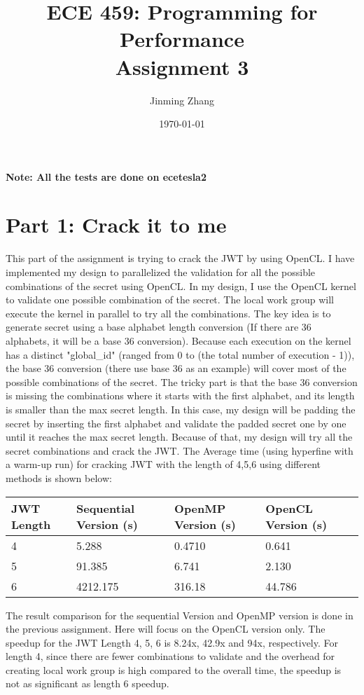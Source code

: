 \documentclass[12pt]{article}
\title{ECE 459: Programming for Performance\\Assignment 3}
\author{Jinming Zhang}
\date{\today}
\begin{document}
\maketitle
\noindent
\textbf{Note: All the tests are done on ecetesla2}
\section{Part 1: Crack it to me}
\noindent
This part of the assignment is trying to crack the JWT by using OpenCL. I have implemented my design to parallelized the validation for all the possible combinations of the secret using OpenCL. In my design, I use the OpenCL kernel to validate one possible combination of the secret. The local work group will execute the kernel in parallel to try all the combinations. The key idea is to generate secret using a base alphabet length conversion (If there are 36 alphabets, it will be a base 36 conversion). Because each execution on the kernel has a distinct "global\_id" (ranged from 0 to (the total number of execution - 1)), the base 36 conversion (there use base 36 as an example) will cover most of the possible combinations of the secret. The tricky part is that the base 36 conversion is missing the combinations where it starts with the first alphabet, and its length is smaller than the max secret length. In this case, my design will be padding the secret by inserting the first alphabet and validate the padded secret one by one until it reaches the max secret length. Because of that, my design will try all the secret combinations and crack the JWT. The Average time (using hyperfine with a warm-up run) for cracking JWT with the length of 4,5,6 using different methods is shown below:
\begin{center}
    \begin{tabular}{ | l | l | l | l | l |}
    \hline
    JWT Length & Sequential Version (s) & OpenMP Version (s) & OpenCL Version (s) \\ 
    \hline
    4 & 5.288 & 0.4710 & 0.641 \\ 
    \hline
    5 & 91.385 & 6.741 & 2.130 \\ 
    \hline
    6 & 4212.175 & 316.18 & 44.786 \\ 
    
    \hline
    \end{tabular}
\end{center} 
\noindent
The result comparison for the sequential Version and OpenMP version is done in the previous assignment. Here will focus on the OpenCL version only. The speedup for the JWT Length 4, 5, 6 is 8.24x, 42.9x and 94x, respectively. For length 4, since there are fewer combinations to validate and the overhead for creating local work group is high compared to the overall time, the speedup is not as significant as length 6 speedup. 
\end{document}
